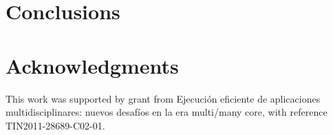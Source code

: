 \documentclass{acm_proc_article-sp}
\begin{document}



 

\section{Conclusions}

\section{Acknowledgments}
This work was supported by grant from Ejecuci\'on eficiente de aplicaciones multidisciplinares: nuevos desaf\'ios en la era multi/many core, with reference TIN2011-28689-C02-01.
%

%
%
\balancecolumns
\end{document}

